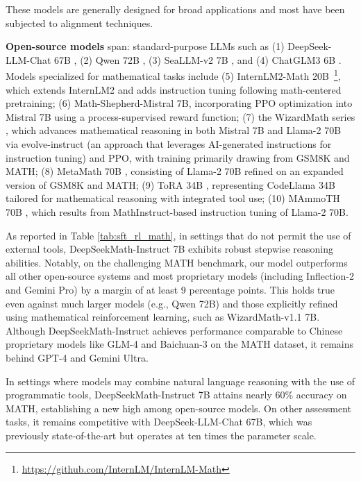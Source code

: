 These models are generally designed for broad applications and most have been subjected to alignment techniques.

\item \textbf{Open-source models} span: standard-purpose LLMs such as (1) DeepSeek-LLM-Chat 67B \citep{deepseek-llm}, (2) Qwen 72B \citep{qwen}, (3) SeaLLM-v2 7B \citep{seallm}, and (4) ChatGLM3 6B \citep{chatglm3}. Models specialized for mathematical tasks include (5) InternLM2-Math 20B~\footnote{\url{https://github.com/InternLM/InternLM-Math}}, which extends InternLM2 and adds instruction tuning following math-centered pretraining; (6) Math-Shepherd-Mistral 7B, incorporating PPO optimization \citep{schulman2017proximal} into Mistral 7B \citep{mistral} using a process-supervised reward function; (7) the WizardMath series \citep{wizardmath}, which advances mathematical reasoning in both Mistral 7B and Llama-2 70B \citep{llama2} via evolve-instruct (an approach that leverages AI-generated instructions for instruction tuning) and PPO, with training primarily drawing from GSM8K and MATH; (8) MetaMath 70B \citep{metamath}, consisting of Llama-2 70B refined on an expanded version of GSM8K and MATH; (9) ToRA 34B \cite{tora}, representing CodeLlama 34B tailored for mathematical reasoning with integrated tool use; (10) MAmmoTH 70B \citep{MathInstruct}, which results from MathInstruct-based instruction tuning of Llama-2 70B.

As reported in Table \ref{tab:sft_rl_math}, in settings that do not permit the use of external tools, DeepSeekMath-Instruct 7B exhibits robust stepwise reasoning abilities. Notably, on the challenging MATH benchmark, our model outperforms all other open-source systems and most proprietary models (including Inflection-2 and Gemini Pro) by a margin of at least 9 percentage points. This holds true even against much larger models (e.g., Qwen 72B) and those explicitly refined using mathematical reinforcement learning, such as WizardMath-v1.1 7B. Although DeepSeekMath-Instruct achieves performance comparable to Chinese proprietary models like GLM-4 and Baichuan-3 on the MATH dataset, it remains behind GPT-4 and Gemini Ultra.

In settings where models may combine natural language reasoning with the use of programmatic tools, DeepSeekMath-Instruct 7B attains nearly 60\% accuracy on MATH, establishing a new high among open-source models. On other assessment tasks, it remains competitive with DeepSeek-LLM-Chat 67B, which was previously state-of-the-art but operates at ten times the parameter scale.

